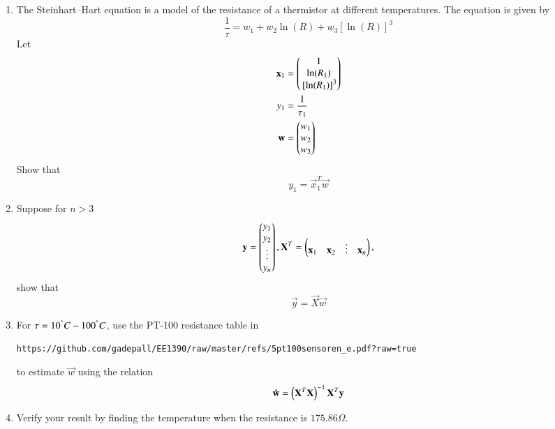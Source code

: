 \documentclass[journal,12pt,twocolumn]{IEEEtran}
\renewcommand\thesection{\arabic{section}}
\begin{document}
%	
%
%
\begin{enumerate}[label=\arabic*.
,ref=\theenumi]
\item The Steinhart–Hart equation is a model of the resistance of a 
thermistor at different temperatures. The equation is given by
\begin{equation}
\label{eq:ls_steiner}
\frac{1}{ \tau}=w_1+w_2\ln(R)+w_3[\ln(R)]^{3}
\end{equation}
%
Let
\begin{align}
\mathbf{x}_1 &= \begin{pmatrix}1 \\ \ln(R_1)\\{}\left[\ln(R_1)\right]^{3}\end{pmatrix}
\\
{y}_1 &=  \frac{1}{\tau_1}
\\
\mathbf{w} &= \begin{pmatrix}w_1\\ w_2\\w_3 \end{pmatrix}
\end{align}
%
Show that
\begin{equation}
{y}_1 =  \vec{x}_1^T\vec{w}
\end{equation}
\item Suppose for $n > 3$
\begin{align}
\mathbf{y} = \begin{pmatrix}y_1 \\ y_2\\ \vdots \\ y_n\end{pmatrix},
\mathbf{X}^T  = \begin{pmatrix}\mathbf{x}_1& \mathbf{x}_2 & \vdots &\mathbf{x}_n \end{pmatrix},
\end{align}
%
show that 
\begin{equation}
\vec{y} = \vec{X}\vec{w}
\end{equation}
%
\item For $\tau = 10^{\degree} C - 100^{\degree} C$, use the PT-100 resistance table in
\begin{lstlisting}
https://github.com/gadepall/EE1390/raw/master/refs/5pt100sensoren_e.pdf?raw=true
\end{lstlisting}
to estimate $\vec{w}$ 
using 
the relation
\begin{equation}
\hat{\mathbf{w}} = \left(\mathbf{X}^T\mathbf{X}\right)^{-1}\mathbf{X}^T\mathbf{y}
\end{equation}
\item Verify your result by finding the temperature when the resistance is $175.86\Omega$.
\end{enumerate}
\end{document}
